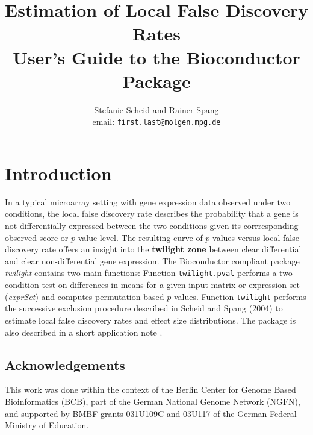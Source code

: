 \documentclass[11pt,a4paper,fleqn]{report}
\title{Estimation of Local False Discovery Rates \bigskip \\ User's Guide to the Bioconductor Package \Rpackage{twilight}}
\author{Stefanie Scheid and Rainer Spang \bigskip \\
  \small email: \texttt{first.last@molgen.mpg.de}
  }
\date{}
\newcommand{\Rfunction}[1]{{\texttt{#1}}}
\newcommand{\Rpackage}[1]{{\textit{#1}}}
\newcommand{\Rclass}[1]{{\textit{#1}}}
\begin{document}
\maketitle



\chapter{Introduction}

In a typical microarray setting with gene expression data observed under two conditions, the local false discovery rate describes the probability that a gene is not differentially expressed between the two conditions given its corrresponding observed score or $p$-value level. The resulting curve of $p$-values versus local false discovery rate offers an insight into the \textbf{twilight zone} between clear differential and clear non-differential gene expression. The Bioconductor compliant package \Rpackage{twilight} contains two main functions: Function \Rfunction{twilight.pval} performs a two-condition test on differences in means for a given input matrix or expression set (\Rclass{exprSet}) and computes permutation based $p$-values. Function \Rfunction{twilight} performs the successive exclusion procedure described in Scheid and Spang (2004) \cite{scheid04} to estimate local false discovery rates and effect size distributions. The package is also described in a short application note \cite{scheid05}.



\section*{Acknowledgements}

This work was done within the context of the Berlin Center for Genome Based Bioinformatics (BCB), part of the German National Genome Network (NGFN), and supported by BMBF grants 031U109C and 03U117 of the German Federal Ministry of Education.



\end{document}
